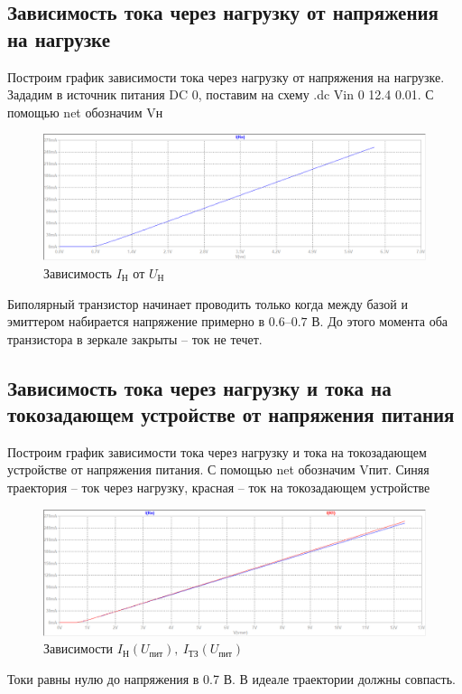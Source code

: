 \documentclass[a4paper, 12pt]{article}
\begin{document}
    \subsection{Зависимость тока через нагрузку от напряжения на нагрузке}
    Построим график зависимости тока через нагрузку от напряжения на нагрузке.
    Зададим в источник питания DC 0, поставим на схему .dc Vin 0 12.4 0.01.
    С помощью net обозначим Vн
    \begin{figure}[H]
        \centering
        \includegraphics[scale=0.46]{1task_Iн(Vн).png}
        \captionsetup{skip=0pt}
        \caption{Зависимость $I_\text{Н}$ от $U_\text{Н}$}
        \label{fig:1task_InVn}
    \end{figure}
    \noindent Биполярный транзистор начинает проводить только когда между базой
    и эмиттером набирается напряжение примерно в $0.6$--$0.7$ В. До этого момента
    оба транзистора в зеркале закрыты -- ток не течет.


    \subsection{Зависимость тока через нагрузку и тока на токозадающем устройстве от напряжения питания}
    Построим график зависимости тока через нагрузку и тока на токозадающем устройстве от напряжения питания.
    С помощью net обозначим Vпит. Синяя траектория -- ток через нагрузку,
    красная -- ток на токозадающем устройстве
    \begin{figure}[H]
        \centering
        \includegraphics[scale=0.46]{1task_Iн(Vпит)_Iтз(Vпит).png}
        \captionsetup{skip=0pt}
        \caption{Зависимости $I_\text{Н}\left( U_\text{пит} \right),\ I_\text{ТЗ}\left( U_\text{пит} \right)$}
        \label{fig:1task_InVl_ItzVl}
    \end{figure}
    \noindent Токи равны нулю до напряжения в 0.7 В. В идеале траектории должны совпасть.
\end{document}
